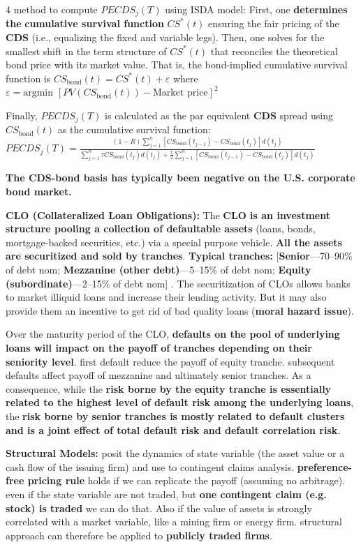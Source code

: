 \documentclass[landscape]{article}
\newcommand{\concept}[1]{\textcolor{conceptcolor}{\textbf{#1}}}
\begin{document}
\begin{multicols}{4}
method to compute $PECDS_j(T)$ using ISDA model: First, one \textbf{determines the} \textbf{cumulative survival function} $CS^*(t)$ ensuring the fair pricing of the \concept{CDS} (i.e., equalizing the fixed and variable legs). Then, one solves for the smallest shift in the term structure of $CS^*(t)$ that reconciles the theoretical bond price with its market value. That is, the bond-implied cumulative survival function is $CS_{\text{bond}}(t) = CS^*(t) + \varepsilon$ where $\varepsilon = \text{argmin } [PV(CS_{\text{bond}}(t)) - \text{Market price}]^2$

Finally, $PECDS_j(T)$ is calculated as the par equivalent \concept{CDS} spread using $CS_{\text{bond}}(t)$ as the cumulative survival function: $PECDS_j(T) = \frac{(1 - R) \sum_{j=1}^{n}[CS_{\text{bond}}(t_{j-1}) - CS_{\text{bond}}(t_j)]d(t_j)}{\sum_{j=1}^{n} \tau CS_{\text{bond}}(t_j)d(t_j) + \frac{1}{2}\sum_{j=1}^{n} [CS_{\text{bond}}(t_{j-1}) - CS_{\text{bond}}(t_j)]d(t_j)}$

\textbf{The CDS-bond basis has typically been negative on the U.S. corporate bond market.}

\textcolor{subsectioncolor}{\textbf{CLO (Collateralized Loan Obligations):}} The \textbf{CLO is an investment structure pooling a collection of defaultable assets} (loans, bonds, mortgage-backed securities, etc.) via a special purpose vehicle. \textbf{All the assets are securitized and sold by tranches}. \textbf{Typical tranches:} [\textcolor{keycolor}{\textbf{Senior}}—70–90\% of debt nom; \textcolor{keycolor}{\textbf{Mezzanine (other debt)}}—5–15\% of debt nom; \textcolor{keycolor}{\textbf{Equity (subordinate)}}—2–15\% of debt nom]
. The securitization of CLOs allows banks to market illiquid loans and increase their lending activity. But it may also provide them an incentive to get rid of bad quality loans (\concept{moral hazard issue}).

Over the maturity period of the CLO, \textbf{defaults on the pool of underlying loans will impact on the payoff of tranches depending on their seniority level}. first default reduce the payoff of equity tranche. subsequent defaults affect payoff of mezzanine and ultimately senior tranches.
As a consequence, while the \textbf{risk borne by the equity tranche is essentially related to the highest level of default risk among the underlying loans}, the \textbf{risk borne by senior tranches is mostly related to default clusters and is a joint effect of total default risk and default correlation risk}.

\textcolor{sectioncolor}{\textbf{Structural Models:}}
posit the dynamics of state variable (the 
asset value or a cash flow of the issuing firm) and use to contingent claims analysis.
\textbf{preference-free pricing rule} holds if we can replicate the payoff (assuming no arbitrage). even if the state variable are not traded, but \textbf{ one contingent claim (e.g. stock) is traded } we can do that. Also if the value of assets is strongly correlated with a market variable, like a mining firm or energy firm. structural approach can therefore be applied to \textbf{publicly traded firms}. 


\end{multicols}
\end{document}
